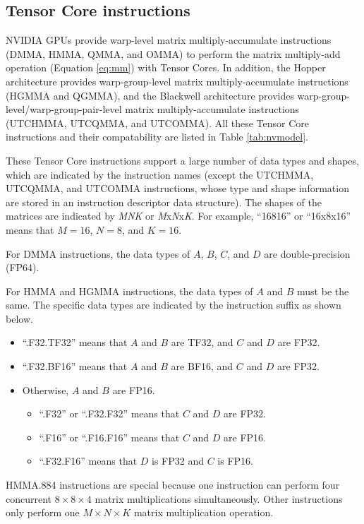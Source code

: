 \subsection{Tensor Core instructions}
\label{ssec:TCinst}
NVIDIA GPUs provide warp-level matrix multiply-accumulate instructions (DMMA, HMMA, QMMA, and OMMA) to perform the matrix multiply-add operation (Equation \ref{eq:mm}) with Tensor Cores. In addition, the Hopper architecture provides warp-group-level matrix multiply-accumulate instructions (HGMMA and QGMMA), and the Blackwell architecture provides warp-group-level/warp-group-pair-level matrix multiply-accumulate instructions (UTCHMMA, UTCQMMA, and UTCOMMA). All these Tensor Core instructions and their compatability are listed in Table \ref{tab:nvmodel}.

These Tensor Core instructions support a large number of data types and shapes, which are indicated by the instruction names (except the UTCHMMA, UTCQMMA, and UTCOMMA instructions, whose type and shape information are stored in an instruction descriptor data structure). The shapes of the matrices are indicated by \textit{MNK} or \textit{M}x\textit{N}x\textit{K}. For example, ``16816'' or ``16x8x16'' means that $M=16$, $N=8$, and $K=16$.

For DMMA instructions, the data types of $A$, $B$, $C$, and $D$ are double-precision (FP64).

For HMMA and HGMMA instructions, the data types of $A$ and $B$ must be the same. The specific data types are indicated by the instruction suffix as shown below.
\begin{itemize}
    \item ``.F32.TF32'' means that $A$ and $B$ are TF32, and $C$ and $D$ are FP32.
    \item ``.F32.BF16'' means that $A$ and $B$ are BF16, and $C$ and $D$ are FP32.
    \item Otherwise, $A$ and $B$ are FP16.
    \begin{itemize}
        \item ``.F32'' or ``.F32.F32'' means that $C$ and $D$ are FP32.
        \item ``.F16'' or ``.F16.F16'' means that $C$ and $D$ are FP16.
        \item ``.F32.F16'' means that $D$ is FP32 and $C$ is FP16.
    \end{itemize}
\end{itemize}
HMMA.884 instructions are special because one instruction can perform four concurrent $8\times 8\times 4$ matrix multiplications simultaneously. Other instructions only perform one $M\times N\times K$ matrix multiplication operation.

